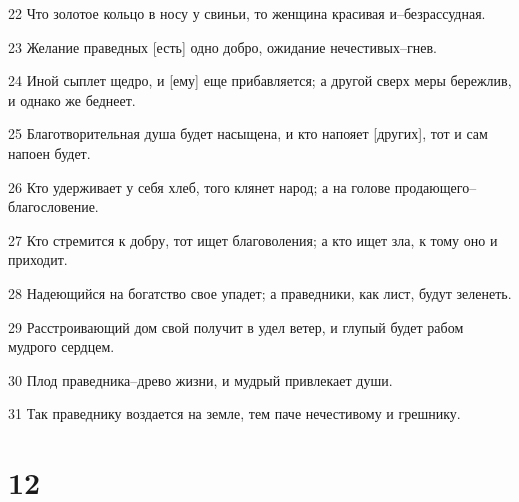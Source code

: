 \par 22 Что золотое кольцо в носу у свиньи, то женщина красивая и--безрассудная.
\par 23 Желание праведных [есть] одно добро, ожидание нечестивых--гнев.
\par 24 Иной сыплет щедро, и [ему] еще прибавляется; а другой сверх меры бережлив, и однако же беднеет.
\par 25 Благотворительная душа будет насыщена, и кто напояет [других], тот и сам напоен будет.
\par 26 Кто удерживает у себя хлеб, того клянет народ; а на голове продающего--благословение.
\par 27 Кто стремится к добру, тот ищет благоволения; а кто ищет зла, к тому оно и приходит.
\par 28 Надеющийся на богатство свое упадет; а праведники, как лист, будут зеленеть.
\par 29 Расстроивающий дом свой получит в удел ветер, и глупый будет рабом мудрого сердцем.
\par 30 Плод праведника--древо жизни, и мудрый привлекает души.
\par 31 Так праведнику воздается на земле, тем паче нечестивому и грешнику.

\chapter{12}

